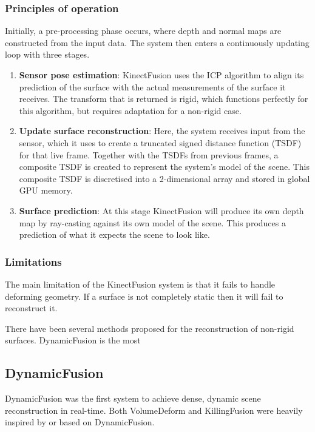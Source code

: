 \documentclass[a4paper]{article}
\begin{document}
\subsubsection{Principles of operation}

Initially, a pre-processing phase occurs, where depth and normal maps are constructed from the input data. The system then enters a continuously updating loop with three stages.

\begin{enumerate}
\item \textbf{Sensor pose estimation}: KinectFusion uses the ICP algorithm to align its prediction of the surface with the actual measurements of the surface it receives. The transform that is returned is rigid, which functions perfectly for this algorithm, but requires adaptation for a non-rigid case. 

\item \textbf{Update surface reconstruction}: Here, the system receives input from the sensor, which it uses to create a truncated signed distance function (TSDF) for that live frame. Together with the TSDFs from previous frames, a composite TSDF is created to represent the system's model of the scene. This composite TSDF is discretised into a 2-dimensional array and stored in global GPU memory.

\item \textbf{Surface prediction}: At this stage KinectFusion will produce its own depth map by ray-casting against its own model of the scene. This produces a prediction of what it expects the scene to look like. 
\end{enumerate}


\subsubsection{Limitations}

The main limitation of the KinectFusion system is that it fails to handle deforming geometry. If a surface is not completely static then it will fail to reconstruct it.  


There have been several methods proposed for the reconstruction of non-rigid surfaces. DynamicFusion is the most 

\subsection{DynamicFusion}

DynamicFusion was the first system to achieve dense, dynamic scene reconstruction in real-time. Both VolumeDeform and KillingFusion were heavily inspired by or based on DynamicFusion.
\end{document}
